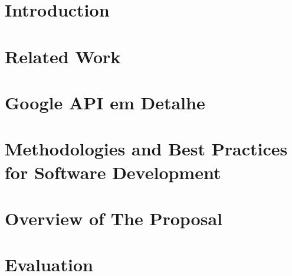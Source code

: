 \documentclass[runningheads,a4paper]{llncs}
\begin{document}
\let\cleardoublepage\relax
\tableofcontents
\section{Introduction}\label{sec:introduction}



\section{Related Work}\label{sec:related}




\section{Google API em Detalhe}\label{sec:proposal}

%


\section{Methodologies and Best Practices for Software Development}\label{sec:proposal}



\section{Overview of The Proposal}\label{sec:evaluation}

%


\section{Evaluation}\label{sec:schedule}

%
\end{document}
